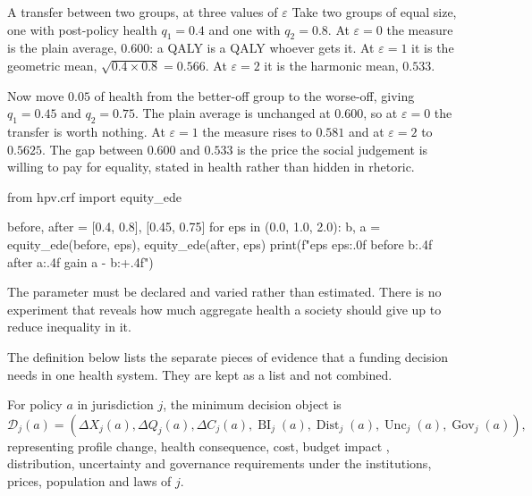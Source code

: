 \begin{workedexample}{A transfer between two groups, at three values of $\varepsilon$}
Take two groups of equal size, one with post-policy health $q_1=0.4$ and one
with $q_2=0.8$. At $\varepsilon=0$ the measure is the plain average, $0.600$: a
QALY is a QALY whoever gets it. At $\varepsilon=1$ it is the geometric mean,
$\sqrt{0.4\times0.8}=0.566$. At $\varepsilon=2$ it is the harmonic mean,
$0.533$.

Now move $0.05$ of health from the better-off group to the worse-off, giving
$q_1=0.45$ and $q_2=0.75$. The plain average is unchanged at $0.600$, so at
$\varepsilon=0$ the transfer is worth nothing. At $\varepsilon=1$ the measure
rises to $0.581$ and at $\varepsilon=2$ to $0.5625$. The gap between $0.600$ and
$0.533$ is the price the social judgement is willing to pay for equality, stated
in health rather than hidden in rhetoric.

\begin{wecode}[Python]
from hpv.crf import equity_ede

before, after = [0.4, 0.8], [0.45, 0.75]
for eps in (0.0, 1.0, 2.0):
    b, a = equity_ede(before, eps), equity_ede(after, eps)
    print(f"eps {eps:.0f}   before {b:.4f}   after {a:.4f}   gain {a - b:+.4f}")
\end{wecode}

\end{workedexample}

\begin{reading}
The parameter must be declared and varied rather than estimated.
There is no experiment that reveals how much aggregate health a society should
give up to reduce inequality in it.
\end{reading}

The definition below lists the separate pieces of evidence that a funding
decision needs in one health system. They are kept as a list and not combined.

\begin{definition}
For policy $a$ in jurisdiction $j$, the minimum decision object is
\[
\mathcal D_j(a)=
(\Delta X_j(a),\Delta Q_j(a),\Delta C_j(a),\operatorname{BI}_j(a),
\operatorname{Dist}_j(a),\operatorname{Unc}_j(a),\operatorname{Gov}_j(a)),
\]
representing profile change, health consequence, cost, budget impact \citep{sullivan_2014},
distribution, uncertainty and governance requirements under the institutions,
prices, population and laws of $j$.
\end{definition}

